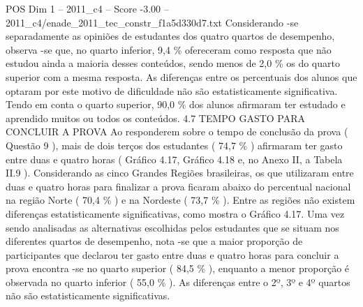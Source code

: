 \begin{textsample}{POS Dim 1 – 2011\_c4 – Score -3.00 – 2011\_c4/enade\_2011\_tec\_constr\_f1a5d330d7.txt}
Considerando -se separadamente as opiniões de estudantes dos quatro quartos de desempenho, observa -se que, no quarto inferior, 9,4 \% ofereceram como resposta que não estudou ainda a maioria desses conteúdos, sendo menos de 2,0 \% os do quarto superior com a mesma resposta.
As diferenças entre os percentuais dos alunos que optaram por este motivo de dificuldade não são estatisticamente significativa.
Tendo em conta o quarto superior, 90,0 \% dos alunos afirmaram ter estudado e aprendido muitos ou todos os conteúdos. 4.7 TEMPO GASTO PARA CONCLUIR A PROVA Ao responderem sobre o tempo de conclusão da prova ( Questão 9 ), mais de dois terços dos estudantes ( 74,7 \% ) afirmaram ter gasto entre duas e quatro horas ( Gráfico 4.17, Gráfico 4.18 e, no Anexo II, a Tabela II.9 ).
Considerando as cinco Grandes Regiões brasileiras, os que utilizaram entre duas e quatro horas para finalizar a prova ficaram abaixo do percentual nacional na região Norte ( 70,4 \% ) e na Nordeste ( 73,7 \% ).
Entre as regiões não existem diferenças estatisticamente significativas, como mostra o Gráfico 4.17.
Uma vez sendo analisadas as alternativas escolhidas pelos estudantes que se situam nos diferentes quartos de desempenho, nota -se que a maior proporção de participantes que declarou ter gasto entre duas e quatro horas para concluir a prova encontra -se no quarto superior ( 84,5 \% ), enquanto a menor proporção é observada no quarto inferior ( 55,0 \% ).
As diferenças entre o 2º, 3º e 4º quartos não são estatisticamente significativas.

\end{textsample}

